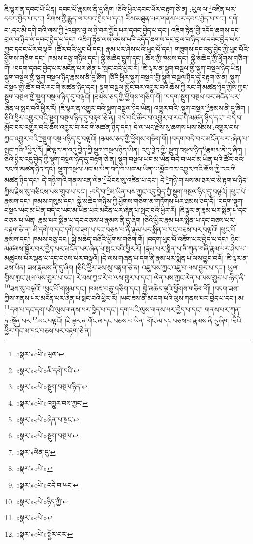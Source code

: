 ཇི་ལྟར་ན་དབང་པོ་ཡིན། དབང་པོ་རྣམས་ནི་དུ་ཞིག །ཅིའི་ཕྱིར་དབང་པོར་བརྟག་ཅེ་ན། :ཡུལ་ལ་\footnote{«སྣར་»«པེ་»ཡུལ་}འཛིན་པར་དབང་བྱེད་པ་དང་། རིགས་ཀྱི་རྒྱུད་ལ་དབང་བྱེད་པ་དང་། རིས་མཐུན་པར་གནས་པར་དབང་བྱེད་པ་དང་། དགེ་བ་:དང་མི་དགེ་བའི་ལས་ཀྱི་\footnote{«སྣར་»«པེ་»མི་དགེ་བའི་}འབྲས་བུ་ལ་ཉེ་བར་སྤྱོད་པར་དབང་བྱེད་པ་དང་། འཇིག་རྟེན་གྱི་འདོད་ཆགས་དང་བྲལ་བ་ཉིད་ལ་དབང་བྱེད་པ་དང་། འཇིག་རྟེན་ལས་འདས་པའི་འདོད་ཆགས་དང་བྲལ་བ་ཉིད་ལ་དབང་བྱེད་པས་ཀྱང་དབང་པོར་བལྟའོ། །ཚོར་བའི་ཕུང་པོ་དང་། རྣམ་པར་ཤེས་པའི་ཕུང་པོ་དང་། གཟུགས་དང་འདུ་བྱེད་ཀྱི་ཕུང་པོའི་ཕྱོགས་གཅིག་དང་། ཁམས་བཅུ་གཉིས་དང་། སྐྱེ་མཆེད་དྲུག་དང་། ཆོས་ཀྱི་ཁམས་དང་། སྐྱེ་མཆེད་ཀྱི་ཕྱོགས་གཅིག་གོ། །བདག་དབང་བྱེད་པར་མངོན་པར་ཞེན་པ་སྤང་བའི་ཕྱིར་རོ། །ཇི་ལྟར་ན་སྡུག་བསྔལ་གྱི་སྡུག་བསྔལ་ཉིད་ཡིན། སྡུག་བསྔལ་གྱི་སྡུག་བསྔལ་ཉིད་རྣམས་ནི་དུ་ཞིག །ཅིའི་ཕྱིར་སྡུག་བསྔལ་གྱི་སྡུག་བསྔལ་ཉིད་དུ་བརྟག་ཅེ་ན། སྡུག་བསྔལ་གྱི་ཚོར་བའི་རང་གི་མཚན་ཉིད་དང་། སྡུག་བསྔལ་མྱོང་བར་འགྱུར་བའི་ཆོས་ཀྱི་རང་གི་མཚན་ཉིད་ཀྱིས་ཀྱང་སྡུག་བསྔལ་གྱི་སྡུག་བསྔལ་ཉིད་དུ་བལྟའོ། །ཐམས་ཅད་ཀྱི་ཕྱོགས་གཅིག་གོ། །བདག་སྡུག་བསྔལ་བར་མངོན་པར་ཞེན་པ་སྤང་བའི་ཕྱིར་རོ། །ཇི་ལྟར་ན་འགྱུར་བའི་སྡུག་བསྔལ་ཉིད་ཡིན། འགྱུར་བའི་:སྡུག་བསྔལ་\footnote{«སྣར་»«པེ་»སྡུག་བསྔལ་ཉིད་}རྣམས་ནི་དུ་ཞིག །ཅིའི་ཕྱིར་འགྱུར་བའི་སྡུག་བསྔལ་ཉིད་དུ་བརྟག་ཅེ་ན། བདེ་བའི་ཚོར་བ་འགྱུར་བ་རང་གི་མཚན་ཉིད་དང་། བདེ་བ་མྱོང་བར་འགྱུར་བའི་ཆོས་འགྱུར་བ་རང་གི་མཚན་ཉིད་དང་། དེ་ལ་ཡང་རྗེས་སུ་ཆགས་པས་སེམས་:འགྱུར་བས་ཀྱང་འགྱུར་བའི་\footnote{«སྣར་»«པེ་»འགྱུར་བས་ཀྱང་}སྡུག་བསྔལ་ཉིད་དུ་བལྟའོ། །ཐམས་ཅད་ཀྱི་ཕྱོགས་གཅིག་གོ། །བདག་བདེ་བར་མངོན་པར་:ཞེན་པ་སྤང་བའི་\footnote{«སྣར་»«པེ་»ཞེན་པ་སྔང་}ཕྱིར་རོ། །ཇི་ལྟར་ན་འདུ་བྱེད་ཀྱི་སྡུག་བསྔལ་ཉིད་ཡིན། འདུ་བྱེད་ཀྱི་:སྡུག་བསྔལ་ཉིད་\footnote{«སྣར་»«པེ་»སྡུག་བསྔལ་}རྣམས་ནི་དུ་ཞིག །ཅིའི་ཕྱིར་འདུ་བྱེད་ཀྱི་སྡུག་བསྔལ་ཉིད་དུ་བརྟག་ཅེ་ན། སྡུག་བསྔལ་ཡང་མ་ཡིན་བདེ་བ་ཡང་མ་ཡིན་པའི་ཚོར་བའི་རང་གི་མཚན་ཉིད་དང་། སྡུག་བསྔལ་ཡང་མ་ཡིན་བདེ་བ་ཡང་མ་ཡིན་པ་མྱོང་བར་འགྱུར་བའི་ཆོས་ཀྱི་རང་གི་མཚན་ཉིད་དང་། དེ་གཉི་གའི་གནས་ངན་ལེན་\footnote{«སྣར་»ལེན་དུ་}ཡོངས་སུ་འཛིན་པ་དང་། དེ་\footnote{«སྣར་»«པེ་»}གཉི་ག་ལས་མ་ཐར་བ་མི་རྟག་པ་ཉིད་ཀྱིས་རྗེས་སུ་བཅིངས་པས་གྲུབ་པ་དང་། :བདེ་བ་\footnote{«སྣར་»«པེ་»བདེ་བ་ཡང་}མ་ཡིན་པས་ཀྱང་འདུ་བྱེད་ཀྱི་སྡུག་བསྔལ་ཉིད་དུ་བལྟའོ། །ཕུང་པོ་རྣམས་དང་། ཁམས་གསུམ་དང་། སྐྱེ་མཆེད་གཉིས་ཀྱི་ཕྱོགས་གཅིག་མ་གཏོགས་པར་ཐམས་ཅད་དོ། །བདག་སྡུག་བསྔལ་ཡང་མ་ཡིན་བདེ་བ་ཡང་མ་ཡིན་པར་མངོན་པར་ཞེན་པ་སྤང་བའི་ཕྱིར་རོ། །ཇི་ལྟར་ན་རྣམ་པར་སྨིན་པ་དང་བཅས་པ་ཡིན། རྣམ་པར་སྨིན་པ་དང་བཅས་པ་རྣམས་ནི་དུ་ཞིག །ཅིའི་ཕྱིར་རྣམ་པར་སྨིན་པ་དང་བཅས་པར་བརྟག་ཅེ་ན། མི་དགེ་བ་དང་དགེ་བ་ཟག་པ་དང་བཅས་པ་ནི་རྣམ་པར་སྨིན་པ་དང་བཅས་པར་བལྟའོ། །ཕུང་པོ་རྣམས་དང་། ཁམས་བཅུ་དང་། སྐྱེ་མཆེད་བཞིའི་ཕྱོགས་གཅིག་གོ། །བདག་ཕུང་པོ་འཇོག་པར་བྱེད་པ་དང་། ཉིང་མཚམས་སྦྱོར་བར་བྱེད་པར་མངོན་པར་ཞེན་པ་སྤང་བའི་ཕྱིར་རོ། །རྣམ་པར་སྨིན་པ་ནི་ཀུན་གཞི་རྣམ་པར་ཤེས་པ་མཚུངས་པར་ལྡན་པ་དང་བཅས་པར་བལྟའོ། །དེ་ལས་གཞན་པ་དག་ནི་རྣམ་པར་སྨིན་པ་ལས་བྱུང་བའོ། །ཇི་ལྟར་ན་ཟས་ཡིན། ཟས་རྣམས་ནི་དུ་ཞིག །ཅིའི་ཕྱིར་ཟས་སུ་བརྟག་ཅེ་ན། འཇུ་བས་ཀྱང་འཇུ་བ་ལས་གྱུར་པ་དང་། ཡུལ་གྱིས་ཀྱང་ཡུལ་ལས་གྱུར་པ་དང་། རེ་བས་ཀྱང་རེ་བ་ལས་གྱུར་པ་དང་། ལེན་པས་ཀྱང་ལེན་པ་ལས་གྱུར་པ་:ཉིད་ནི་\footnote{«སྣར་»«པེ་»ཉིད་ཀྱི་}ཟས་སུ་བལྟའོ། །ཕུང་པོ་གསུམ་དང་། ཁམས་བཅུ་གཅིག་དང་། སྐྱེ་མཆེད་ལྔའི་ཕྱོགས་གཅིག་གོ། །བདག་ཟས་ཀྱིས་གནས་པར་མངོན་པར་ཞེན་པ་སྤང་བའི་ཕྱིར་རོ། །ཡང་ཟས་ནི་མ་དག་པའི་ལུས་གནས་པར་བྱེད་པ་དང་། མ་\footnote{«སྣར་»«པེ་»}དག་པ་དང་དག་པའི་ལུས་གནས་པར་བྱེད་པ་དང་། དག་པའི་ལུས་གནས་པར་བྱེད་པ་དང་། གནས་པར་ཀུན་ཏུ་:སྟོན་པར་\footnote{«སྣར་»«པེ་»སྦྱོར་བར་}ཡང་བལྟའོ། །ཇི་ལྟར་ན་གོང་མ་དང་བཅས་པ་ཡིན། གོང་མ་དང་བཅས་པ་རྣམས་ནི་དུ་ཞིག །ཅིའི་ཕྱིར་གོང་མ་དང་བཅས་པར་བརྟག་ཅེ་ན། 
